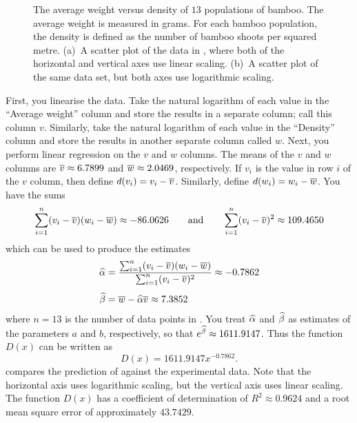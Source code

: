 \documentclass[a4paper,oneside,12pt]{article}
\begin{document}
{\begin{solution}
\begin{figure}[!htbp]
{  \label{subfig:logarithm:bamboo_log}
}
\caption{%
  The average weight versus density of $13$ populations of bamboo.
  The average weight is measured in grams.  For each bamboo
  population, the density is defined as the number of bamboo shoots
  per squared metre.  (a)~A scatter plot of the data in
  , where both of the horizontal and
  vertical axes use linear scaling.  (b)~A scatter plot of the same
  data set, but both axes use logarithmic scaling.
}
\label{fig:logarithm:bamboo_linear_log}
\end{figure}

First, you linearise the data.  Take the natural logarithm of each
value in the ``Average weight'' column and store the results in a
separate column; call this column $v$.  Similarly, take the natural
logarithm of each value in the ``Density'' column and store the
results in another separate column called $w$.  Next, you perform
linear regression on the $v$ and $w$ columns.  The means of the $v$
and $w$ columns are $\overline{v} \approx 6.7899$ and
$\overline{w} \approx 2.0469$, respectively.  If $v_i$ is the value in row
$i$ of the $v$ column, then define $d(v_i) = v_i - \overline{v}$.  Similarly,
define $d(w_i) = w_i - \overline{w}$.  You have the sums
\[
\sum_{i=1}^n (v_i - \overline{v}) (w_i - \overline{w})
\approx
-86.0626
\qquad
\text{and}
\qquad
\sum_{i=1}^n (v_i - \overline{v})^2
\approx
109.4650
\]
which can be used to produce the estimates
\begin{align*}
\widehat{\alpha}
&=
\frac{
  \sum_{i=1}^n (v_i - \overline{v}) (w_i - \overline{w})
}{
  \sum_{i=1}^n (v_i - \overline{v})^2
}
\approx
-0.7862 \\[4pt]
\widehat{\beta}
&=
\overline{w} - \widehat{\alpha} \overline{v}
\approx
7.3852
\end{align*}
where $n = 13$ is the number of data points in
.  You treat $\widehat{\alpha}$ and $\widehat{\beta}$ as
estimates of the parameters $a$ and $b$, respectively, so that
$e^{\widehat{\beta}} \approx 1611.9147$.  Thus the function $D(x)$ can be
written as
\begin{equation}
\label{eqn:logarithm:bamboo_power_regression}
D(x)
=
1611.9147 x^{-0.7862}.
\end{equation}
 compares the prediction of
 against the
experimental data.  Note that the horizontal axis uses logarithmic
scaling, but the vertical axis uses linear scaling.  The function
$D(x)$ has a coefficient of determination of $R^2 \approx 0.9624$ and
a root mean square error of approximately $43.7429$.


\end{solution}}
\end{document}
